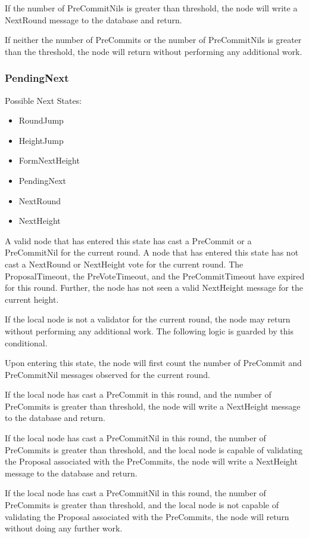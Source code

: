 If the number of PreCommitNils is greater than threshold, the node will
write a Next\-Round message to the database and return.

If neither the number of PreCommits or the number of PreCommitNils is
greater than the threshold, the node will return without performing any
additional work.


\subsubsection{PendingNext}

Possible Next States:

\begin{itemize}
    \item RoundJump
    \item HeightJump
    \item FormNextHeight
    \item PendingNext
    \item NextRound
    \item NextHeight
\end{itemize}

A valid node that has entered this state has cast a PreCommit or a
PreCommitNil for the current round.
A node that has entered this state has not cast a NextRound or
NextHeight vote for the current round.
The ProposalTimeout, the PreVoteTimeout, and the PreCommitTimeout have
expired for this round.
Further, the node has not seen a valid NextHeight message for the
current height.

If the local node is not a validator for the current round, the node
may return without performing any additional work.
The following logic is guarded by this conditional.

Upon entering this state, the node will first count the number of
PreCommit and PreCommitNil messages observed for the current round.

If the local node has cast a PreCommit in this round, and the number of
PreCommits is greater than threshold, the node will write a NextHeight
message to the database and return.

If the local node has cast a PreCommitNil in this round, the number of
PreCommits is greater than threshold, and the local node is capable of
validating the Proposal associated with the PreCommits, the node will
write a NextHeight message to the database and return.

If the local node has cast a PreCommitNil in this round, the number of
PreCommits is greater than threshold, and the local node is not capable
of validating the Proposal associated with the PreCommits, the node will
return without doing any further work.

